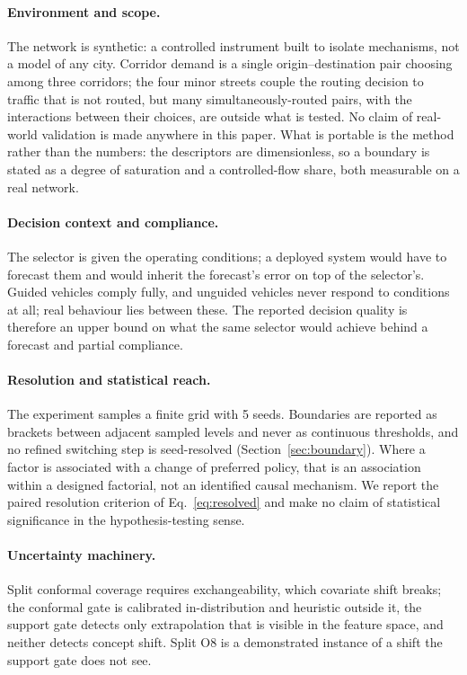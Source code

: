 \documentclass[runningheads]{llncs}
\begin{document}
\paragraph{Environment and scope.} The network is synthetic: a controlled
instrument built to isolate mechanisms, not a model of any city. Corridor demand
is a single origin--destination pair choosing among three corridors; the four
minor streets couple the routing decision to traffic that is not routed, but
many simultaneously-routed pairs, with the interactions between their choices,
are outside what is tested. No claim of real-world validation is made anywhere
in this paper. What is portable is the method rather than the numbers: the
descriptors are dimensionless, so a boundary is stated as a degree of saturation
and a controlled-flow share, both measurable on a real network.

\paragraph{Decision context and compliance.} The selector is given the operating
conditions; a deployed system would have to forecast them and would inherit the
forecast's error on top of the selector's. Guided vehicles comply fully, and
unguided vehicles never respond to conditions at all; real behaviour lies
between these. The reported decision quality is therefore an upper bound on what
the same selector would achieve behind a forecast and partial compliance.

\paragraph{Resolution and statistical reach.} The experiment samples a finite
grid with 5 seeds. Boundaries are reported as brackets between
adjacent sampled levels and never as continuous thresholds, and no refined
switching step is seed-resolved (Section~\ref{sec:boundary}). Where a factor is
associated with a change of preferred policy, that is an association within a
designed factorial, not an identified causal mechanism. We report the paired
resolution criterion of Eq.~\ref{eq:resolved} and make no claim of statistical
significance in the hypothesis-testing sense.

\paragraph{Uncertainty machinery.} Split conformal coverage requires
exchangeability, which covariate shift breaks; the conformal gate is calibrated
in-distribution and heuristic outside it, the support gate detects only
extrapolation that is visible in the feature space, and neither detects concept
shift. Split O8 is a demonstrated instance of a shift the support gate does not
see.
\end{document}
